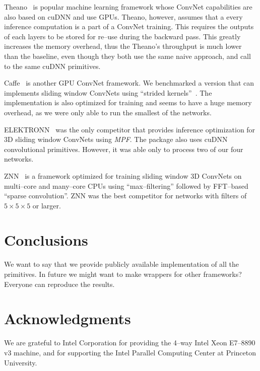 \documentclass[conference]{./IEEEtran/IEEEtran}
\begin{document}
  Theano~\cite{bergstra2010theano} is popular machine learning
  framework whose ConvNet capabilities are also based on cuDNN and use
  GPUs.  Theano, however, assumes that a every inference computation
  is a part of a ConvNet training.  This requires the outputs of each
  layers to be stored for re--use during the backward pass.  This
  greatly increases the memory overhead, thus the Theano's throughput
  is much lower than the baseline, even though they both use the same
  naive approach, and call to the same cuDNN primitives.

  Caffe~\cite{jia2014caffe} is another GPU ConvNet framework.  We
  benchmarked a version that can implements sliding window ConvNets
  using ``strided kernels''~\cite{tschopp2015efficient}.  The
  implementation is also optimized for training and seems to have a
  huge memory overhead, as we were only able to run the smallest of
  the networks.

  ELEKTRONN~\cite{ELEKTRON2015} was the only competitor that provides
  inference optimization for 3D sliding window ConvNets using
  \emph{MPF}.  The package also uses cuDNN convolutional primitives.
  However, it was able only to process two of our four networks.

  ZNN~\cite{zlateski2015znn} is a framework optimized for training
  sliding window 3D ConvNets on multi--core and many--core CPUs using
  ``max--filtering'' followed by FFT--based ``sparse convolution''.
  ZNN was the best competitor for networks with filters of $5 \times 5
  \times 5$ or larger.



\section{Conclusions}

  We want to say that we provide publicly available implementation of
  all the primitives.  In future we might want to make wrappers for
  other frameworks?  Everyone can reproduce the results.

\section{Acknowledgments}
We are grateful to Intel Corporation for providing the 4–way Intel
Xeon E7–8890 v3 machine, and for supporting the Intel Parallel
Computing Center at Princeton University.





\end{document}
